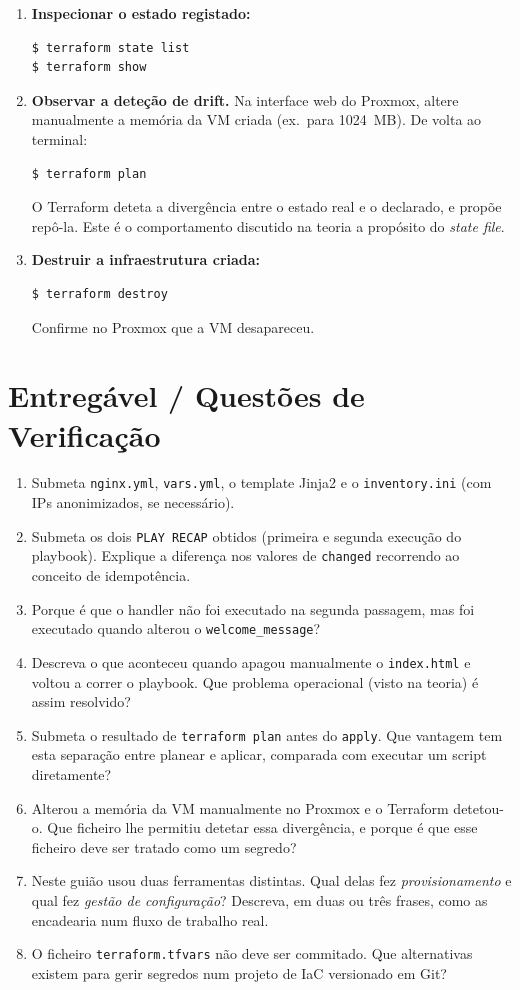 \documentclass[11pt,a4paper]{article}
\begin{document}
\begin{enumerate}[label=\arabic*.,resume]
  \item \textbf{Inspecionar o estado registado:}
\begin{lstlisting}
$ terraform state list
$ terraform show
\end{lstlisting}

  \item \textbf{Observar a deteção de drift.} Na interface web do Proxmox, altere manualmente a memória da VM criada (ex.\ para 1024~MB). De volta ao terminal:
\begin{lstlisting}
$ terraform plan
\end{lstlisting}
  O Terraform deteta a divergência entre o estado real e o declarado, e propõe repô-la. Este é o comportamento discutido na teoria a propósito do \emph{state file}.

  \item \textbf{Destruir a infraestrutura criada:}
\begin{lstlisting}
$ terraform destroy
\end{lstlisting}
  Confirme no Proxmox que a VM desapareceu.

\end{enumerate}

\section{Entregável / Questões de Verificação}
\begin{enumerate}[label=\alph*)]
  \setlength\itemsep{0.2cm}
  \item Submeta \texttt{nginx.yml}, \texttt{vars.yml}, o template Jinja2 e o \texttt{inventory.ini} (com IPs anonimizados, se necessário).
  \item Submeta os dois \texttt{PLAY RECAP} obtidos (primeira e segunda execução do playbook). Explique a diferença nos valores de \texttt{changed} recorrendo ao conceito de idempotência.
  \item Porque é que o handler não foi executado na segunda passagem, mas foi executado quando alterou o \texttt{welcome\_message}?
  \item Descreva o que aconteceu quando apagou manualmente o \texttt{index.html} e voltou a correr o playbook. Que problema operacional (visto na teoria) é assim resolvido?
  \item Submeta o resultado de \texttt{terraform plan} antes do \texttt{apply}. Que vantagem tem esta separação entre planear e aplicar, comparada com executar um script diretamente?
  \item Alterou a memória da VM manualmente no Proxmox e o Terraform detetou-o. Que ficheiro lhe permitiu detetar essa divergência, e porque é que esse ficheiro deve ser tratado como um segredo?
  \item Neste guião usou duas ferramentas distintas. Qual delas fez \emph{provisionamento} e qual fez \emph{gestão de configuração}? Descreva, em duas ou três frases, como as encadearia num fluxo de trabalho real.
  \item O ficheiro \texttt{terraform.tfvars} não deve ser commitado. Que alternativas existem para gerir segredos num projeto de IaC versionado em Git?
\end{enumerate}
\end{document}
